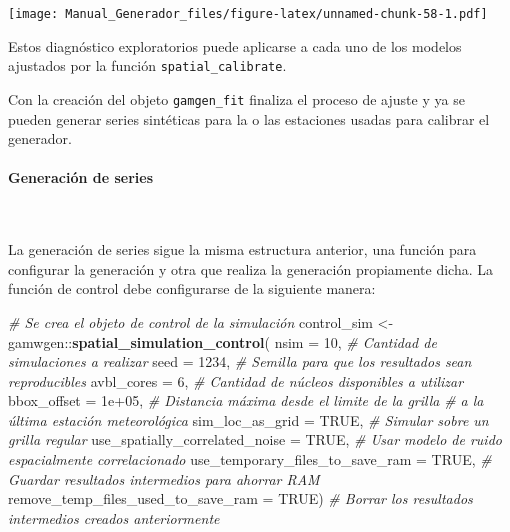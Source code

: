 \documentclass[
  12pt]{article}
\newenvironment{Shaded}{}{}
\newcommand{\CommentTok}[1]{\textcolor[rgb]{0.38,0.63,0.69}{\textit{#1}}}
\newcommand{\DataTypeTok}[1]{\textcolor[rgb]{0.56,0.13,0.00}{#1}}
\newcommand{\DecValTok}[1]{\textcolor[rgb]{0.25,0.63,0.44}{#1}}
\newcommand{\FloatTok}[1]{\textcolor[rgb]{0.25,0.63,0.44}{#1}}
\newcommand{\KeywordTok}[1]{\textcolor[rgb]{0.00,0.44,0.13}{\textbf{#1}}}
\newcommand{\NormalTok}[1]{#1}
\newcommand{\OperatorTok}[1]{\textcolor[rgb]{0.40,0.40,0.40}{#1}}
\newcommand{\OtherTok}[1]{\textcolor[rgb]{0.00,0.44,0.13}{#1}}
\newcommand{\StringTok}[1]{\textcolor[rgb]{0.25,0.44,0.63}{#1}}
\begin{document}
\begin{Shaded}
\end{Shaded}

\texttt{[image: Manual\_Generador\_files/figure-latex/unnamed-chunk-58-1.pdf]}

Estos diagnóstico exploratorios puede aplicarse a cada uno de los modelos ajustados por la función \texttt{spatial\_calibrate}.

Con la creación del objeto \texttt{gamgen\_fit} finaliza el proceso de ajuste y ya se pueden generar series sintéticas para la o las estaciones usadas para calibrar el generador.

\hypertarget{generaciuxf3n-de-series-3}{%
\paragraph{Generación de series}\label{generaciuxf3n-de-series-3}}

~

La generación de series sigue la misma estructura anterior, una función para configurar la generación y otra que realiza la generación propiamente dicha. La función de control debe configurarse de la siguiente manera:

\begin{Shaded}
\begin{Highlighting}[]
\CommentTok{# Se crea el objeto de control de la simulación}
\NormalTok{control_sim <-}\StringTok{ }\NormalTok{gamwgen}\OperatorTok{::}\KeywordTok{spatial_simulation_control}\NormalTok{(}
  \DataTypeTok{nsim =} \DecValTok{10}\NormalTok{, }
  \CommentTok{# Cantidad de simulaciones a realizar}
  \DataTypeTok{seed =} \DecValTok{1234}\NormalTok{, }
  \CommentTok{# Semilla para que los resultados sean reproducibles}
  \DataTypeTok{avbl_cores =} \DecValTok{6}\NormalTok{, }
  \CommentTok{# Cantidad de núcleos disponibles a utilizar}
  \DataTypeTok{bbox_offset =} \FloatTok{1e+05}\NormalTok{,}
  \CommentTok{# Distancia máxima desde el limite de la grilla }
  \CommentTok{# a la última estación meteorológica}
  \DataTypeTok{sim_loc_as_grid =} \OtherTok{TRUE}\NormalTok{,}
  \CommentTok{# Simular sobre un grilla regular}
  \DataTypeTok{use_spatially_correlated_noise =} \OtherTok{TRUE}\NormalTok{, }
  \CommentTok{# Usar modelo de ruido espacialmente correlacionado}
  \DataTypeTok{use_temporary_files_to_save_ram =} \OtherTok{TRUE}\NormalTok{, }
  \CommentTok{# Guardar resultados intermedios para ahorrar RAM}
  \DataTypeTok{remove_temp_files_used_to_save_ram =} \OtherTok{TRUE}\NormalTok{) }
\CommentTok{# Borrar los resultados intermedios creados anteriormente}
\end{Highlighting}
\end{Shaded}
\end{document}
